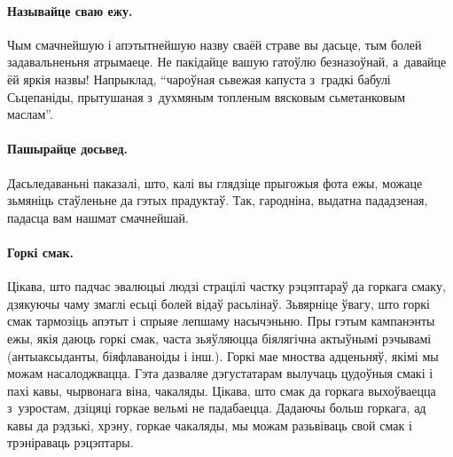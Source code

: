 \paragraph{Называйце сваю ежу.}
Чым смачнейшую і апэтытнейшую назву сваёй страве вы дасьце, тым болей задавальненьня атрымаеце. Не пакідайце вашую гатоўлю безназоўнай, а~давайце ёй яркія назвы! Напрыклад, ``чароўная сьвежая капуста з~градкі бабулі Сьцепаніды, прытушаная з~духмяным топленым вясковым сьметанковым маслам''.

\paragraph{Пашырайце досьвед.}
Дасьледаваньні паказалі, што, калі вы глядзіце прыгожыя фота ежы, можаце зьмяніць стаўленьне да гэтых прадуктаў. Так, гародніна, выдатна пададзеная, падасца вам нашмат смачнейшай.

\paragraph{Горкі смак.}
Цікава, што падчас эвалюцыі людзі страцілі частку рэцэптараў да горкага смаку, дзякуючы чаму змаглі есьці болей відаў расьлінаў. Зьвярніце ўвагу, што горкі смак тармозіць апэтыт і спрыяе лепшаму насычэньню. Пры гэтым кампанэнты ежы, якія даюць горкі смак, часта зьяўляюцца біялягічна актыўнымі рэчывамі (антыаксыданты, біяфлаваноіды і інш.). Горкі мае мноства адценьняў, якімі мы можам насалоджвацца. Гэта дазваляе дэгустатарам вылучаць цудоўныя смакі і пахі кавы, чырвонага віна, чакаляды. Цікава, што смак да горкага выхоўваецца з~узростам, дзіцяці горкае вельмі не падабаецца. Дадаючы больш горкага, ад кавы да рэдзькі, хрэну, горкае чакаляды, мы можам разьвіваць свой смак і трэніраваць рэцэптары.
